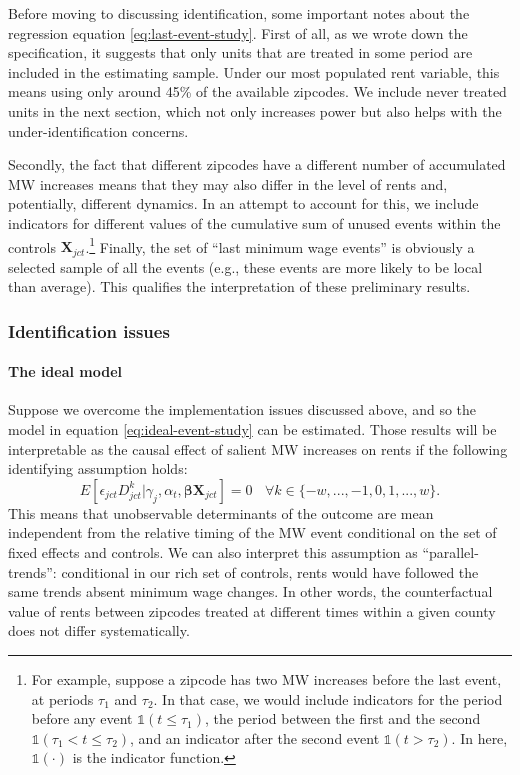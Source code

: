     Before moving to discussing identification, some important notes about the regression equation \eqref{eq:last-event-study}. First of all, as we wrote down the specification, it suggests that only units that are treated in some period are included in the estimating sample. Under our most populated rent variable, this means using only around 45\% of the available zipcodes. We include never treated units in the next section, which not only increases power but also helps with the under-identification concerns. 
    
    Secondly, the fact that different zipcodes have a different number of accumulated MW increases means that they may also differ in the level of rents and, potentially, different dynamics. In an attempt to account for this, we include indicators for different values of the cumulative sum of unused events within the controls $\boldsymbol{X}_{jct}$.\footnote{For example, suppose a zipcode has two MW increases before the last event, at periods $\tau_1$ and $\tau_2$. In that case, we would include indicators for the period before any event $\mathds{1}\left(t \leq \tau_1\right)$, the period between the first and the second $\mathds{1}\left(\tau_1 <  t \leq \tau_2 \right)$, and an indicator after the second event $\mathds{1}\left(t > \tau_2\right)$. In here, $\mathds{1} (\cdot)$ is the indicator function.} Finally, the set of ``last minimum wage events'' is obviously a selected sample of all the events (e.g., these events are more likely to be local than average). This qualifies the interpretation of these preliminary results.

\subsubsection{Identification issues}
    
    \paragraph{The ideal model}
    
    Suppose we overcome the implementation issues discussed above, and so the model in equation \eqref{eq:ideal-event-study} can be estimated. Those results will be interpretable as the causal effect of salient MW increases on rents if the following identifying assumption holds: $$E \left[ \epsilon_{jct} D_{jct}^k \big| \gamma_j, \alpha_{t}, \boldsymbol{\beta} \boldsymbol{X}_{jct}\right]  = 0 \ \ \ \ \forall k\in\{-w, ..., -1, 0, 1, ..., w\}. $$ This means that unobservable determinants of the outcome are mean independent from the relative timing of the MW event conditional on the set of fixed effects and controls. We can also interpret this assumption as ``parallel-trends'': conditional in our rich set of controls, rents would have followed the same trends absent minimum wage changes. In other words, the counterfactual value of rents between zipcodes treated at different times within a given county does not differ systematically.
    
